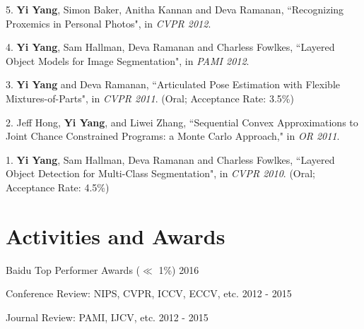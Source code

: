 \documentclass[margin]{res3}
\newenvironment{list1}{
  \begin{list}{\ding{113}}{%
      \setlength{\itemsep}{0.03in}
      \setlength{\parsep}{0in} \setlength{\parskip}{0in}
      \setlength{\topsep}{0in} \setlength{\partopsep}{0in}
      \setlength{\leftmargin}{0in}}}{\end{list}}
\begin{document}
\begin{resume}
\begin{list1}
\item[] 5. {\bf Yi Yang}, Simon Baker, Anitha Kannan and Deva Ramanan, 
``Recognizing Proxemics in Personal Photos", 
in \textit{CVPR 2012}.

\item[] 4. {\bf Yi Yang}, Sam Hallman, Deva Ramanan and Charless Fowlkes, 
``Layered Object Models for Image Segmentation", 
in \textit{PAMI 2012}.

\item[] 3. {\bf Yi Yang} and Deva Ramanan, 
``Articulated Pose Estimation with Flexible Mixtures-of-Parts", 
in \textit{CVPR 2011}. (Oral; Acceptance Rate: 3.5\%)

\item[] 2. Jeff Hong, {\bf Yi Yang}, and Liwei Zhang, 
``Sequential Convex Approximations to Joint Chance Constrained Programs: a Monte Carlo Approach,"
in \textit{OR 2011}.

\item[] 1. {\bf Yi Yang}, Sam Hallman, Deva Ramanan and Charless Fowlkes,
``Layered Object Detection for Multi-Class Segmentation",
in \textit{CVPR 2010}. (Oral; Acceptance Rate: 4.5\%)

\end{list1}


\section{\sc Activities and Awards}

\begin{list1}
\item[] Baidu Top Performer Awards ($\ll$ 1\%) \hfill{2016}

\item[] Conference Review: NIPS, CVPR, ICCV, ECCV, etc. \hfill{2012 - 2015}

\item[] Journal Review: PAMI, IJCV, etc. \hfill{2012 - 2015}


\end{list1}
\end{resume}
\end{document}
